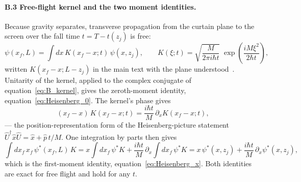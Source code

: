 \documentclass[11pt,a4paper]{article}
\begin{document}
\paragraph{B.3 Free-flight kernel and the two moment identities.} Because gravity separates, transverse propagation from the curtain plane to the screen over the fall time $t = T - t(z_j)$ is free:
\begin{equation}
\psi(x_f, L) = \int dx\,K(x_f - x; t)\,\psi(x, z_j), \qquad
K(\xi; t) = \sqrt{\frac{M}{2\pi i\hbar t}}\;\exp\!\left(\frac{iM\xi^2}{2\hbar t}\right),
\label{eq:B_kernel}
\end{equation}
written $K(x_f - x; L - z_j)$ in the main text with the plane understood~\cite{Holland1993}. Unitarity of the kernel, applied to the complex conjugate of equation~\eqref{eq:B_kernel}, gives the zeroth-moment identity, equation~\eqref{eq:Heisenberg_0}. The kernel's phase gives
\begin{equation}
(x_f - x)\,K(x_f - x; t) = \frac{i\hbar t}{M}\,\partial_x K(x_f - x; t),
\label{eq:B_kernel_identity}
\end{equation}
--- the position-representation form of the Heisenberg-picture statement $\hat{U}^\dagger\hat{x}\hat{U} = \hat{x} + \hat{p}\,t/M$. One integration by parts then gives
\begin{equation*}
\int dx_f\,x_f\,\psi^*(x_f, L)\,K = x\!\int dx_f\,\psi^* K + \frac{i\hbar t}{M}\,\partial_x\!\int dx_f\,\psi^* K = x\,\psi^*(x, z_j) + \frac{i\hbar t}{M}\,\partial_x\psi^*(x, z_j),
\end{equation*}
which is the first-moment identity, equation~\eqref{eq:Heisenberg_x}. Both identities are exact for free flight and hold for any $t$.
\end{document}
